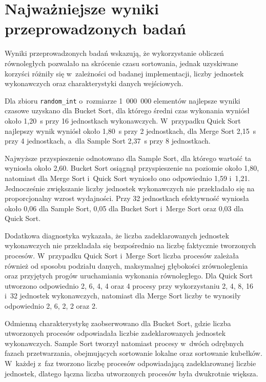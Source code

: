 \section{Najważniejsze wyniki przeprowadzonych badań}
\label{sec:NajwazniejszeWyniki}

Wyniki przeprowadzonych badań wskazują, że wykorzystanie obliczeń równoległych pozwalało na skrócenie czasu sortowania,
jednak uzyskiwane korzyści różniły się w~zależności od badanej implementacji, liczby jednostek wykonawczych oraz charakterystyki danych wejściowych. 

Dla zbioru \texttt{random\_int} o~rozmiarze 1~000~000 elementów najlepsze wyniki czasowe uzyskano dla Bucket Sort, 
dla którego średni czas wykonania wyniósł około 1,20~s przy 16 jednostkach wykonawczych.
W~przypadku Quick Sort najlepszy wynik wyniósł około 1,80~s przy 2 jednostkach, 
dla Merge Sort 2,15~s przy 4 jednostkach, a~dla Sample Sort 2,37~s przy 8 jednostkach.

Najwyższe przyspieszenie odnotowano dla Sample Sort, dla którego wartość ta wyniosła około 2,60. 
Bucket Sort osiągnął przyspieszenie na poziomie około 1,80, natomiast dla Merge Sort i~Quick Sort wyniosło ono odpowiednio 1,59 i~1,21. 
Jednocześnie zwiększanie liczby jednostek wykonawczych nie przekładało się na proporcjonalny wzrost wydajności. 
Przy 32 jednostkach efektywność wyniosła około 0,06 dla Sample Sort, 0,05 dla Bucket Sort i~Merge Sort oraz 0,03 dla Quick Sort.

Dodatkowa diagnostyka wykazała, że liczba zadeklarowanych jednostek wykonawczych
nie przekładała się bezpośrednio na liczbę faktycznie tworzonych procesów.
W~przypadku Quick Sort i~Merge Sort liczba procesów zależała również od sposobu podziału danych, 
maksymalnej głębokości zrównoleglenia oraz przyjętych progów uruchamiania wykonania równoległego. 
Dla Quick Sort utworzono odpowiednio 2, 6, 4, 4 oraz 4 procesy przy wykorzystaniu 2, 4, 8, 16 i~32 jednostek wykonawczych, 
natomiast dla Merge Sort liczby te wynosiły odpowiednio 2, 6, 2, 2 oraz 2.

Odmienną charakterystykę zaobserwowano dla Bucket Sort, gdzie liczba utworzonych procesów odpowiadała liczbie zadeklarowanych jednostek wykonawczych.
Sample Sort tworzył natomiast procesy w~dwóch odrębnych fazach przetwarzania, obejmujących sortowanie lokalne oraz sortowanie kubełków.
W~każdej z~faz tworzono liczbę procesów odpowiadającą zadeklarowanej liczbie jednostek, dlatego łączna liczba utworzonych procesów była dwukrotnie większa.

